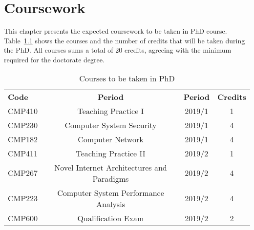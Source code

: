 \chapter{Coursework}\label{cap:coursework}
\thispagestyle{empty}

This chapter presents the expected coursework to be taken in PhD course. Table~\ref{tab:phd-courses} shows the courses and the number of credits that will be taken during the PhD. All courses sums a total of 20 credits, agreeing with the minimum required for the doctorate degree.

\begin{table}[htp]
\centering
\begin{tabularx}{\textwidth}{ l | c | c | c}
\hline
{\bf Code} & {\bf Period} & \textbf{Period} & \textbf{Credits} \\ 
CMP410 & Teaching Practice I & 2019/1 & 1 \\
CMP230 & Computer System Security & 2019/1 & 4 \\
CMP182 & Computer Network & 2019/1 & 4 \\
CMP411 & Teaching Practice II & 2019/2 & 1 \\
CMP267 & Novel Internet Architectures and Paradigms & 2019/2 & 4 \\
CMP223 & Computer System Performance Analysis & 2019/2 & 4 \\
CMP600 & Qualification Exam & 2019/2 & 2 \\

\hline
\end{tabularx}
\caption{Courses to be taken in PhD}
\label{tab:phd-courses}
\end{table}

